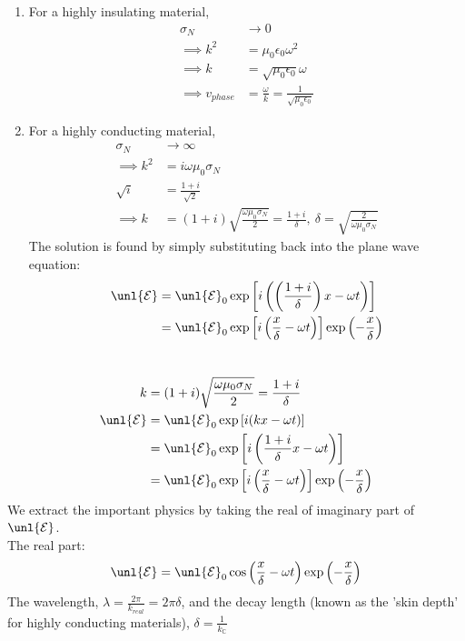 \documentclass[a4paper, 11pt, normalem]{report}
\newcommand\E{\mathcal{E}}
\newcommand\uE{\unl{\E}}
\newcommand\eno{\epsilon_0}
\newcommand\om{\omega}
\newcommand\lam{\lambda}
\begin{document}
\begin{enumerate}
    \item For a highly insulating material,
    \begin{align}
        \sigma_N &\to 0 \\
        \implies k^2 &= \mu_0\eno\omega^2 \\
        \implies k &= \sqrt{\mu_0\eno}\omega \\
        \implies v_{phase} &= \frac{\omega}{k} = \frac{1}{\sqrt{\mu_0\eno}}
    \end{align}
    \item For a highly conducting material,
    \begin{align}
        \sigma_N &\to \infty \\
        \implies k^2 &= i\omega\mu_0\sigma_N \\
        \sqrt{i} &= \frac{1 + i}{\sqrt{2}} \\
        \implies k &= (1 + i)\sqrt{\frac{\omega\mu_0\sigma_N}{2}} = \frac{1 + i}{\delta}, ~\delta = \sqrt{\frac{2}{\omega\mu_0\sigma_N}}
    \end{align}
    The solution is found by simply substituting back into the plane wave equation:
    \begin{align}
        \uE &= \uE_0\exp\left[i\left(\left(\frac{1 + i}{\delta}\right)x - \omega t\right)\right] \\
        &= \uE_0\exp\left[i\left(\frac{x}{\delta} - \omega t\right)\right]\exp\left(-\frac{x}{\delta}\right)
    \end{align}
\end{enumerate}

\chapter{}
\begin{align}
    k &= (1 + i)\sqrt{\frac{\om\mu_0\sigma_N}{2}} = \frac{1 + i}{\delta} \\
    \uE &= \uE_0 \exp\left[i(kx - \om t)\right] \\
    &= \uE_0\exp\left[i\left(\frac{1+i}{\delta}x - \om t\right)\right] \\
    &= \uE_0\exp\left[i\left(\frac{x}{\delta} - \om t\right)\right]\exp\left(-\frac{x}{\delta}\right)
\end{align}
We extract the important physics by taking the real of imaginary part of $\uE$.\\
The real part:
\begin{equation}
    \uE = \uE_0\cos\left(\frac{x}{\delta}- \om t\right)\exp\left(-\frac{x}{\delta}\right)
\end{equation}
The wavelength, $\lam = \frac{2\pi}{k_{real}} = 2\pi\delta$, and the decay length (known as the 'skin depth' for highly conducting materials), $\delta = \frac{1}{k_{\mathbb{C}}}$
\end{document}
